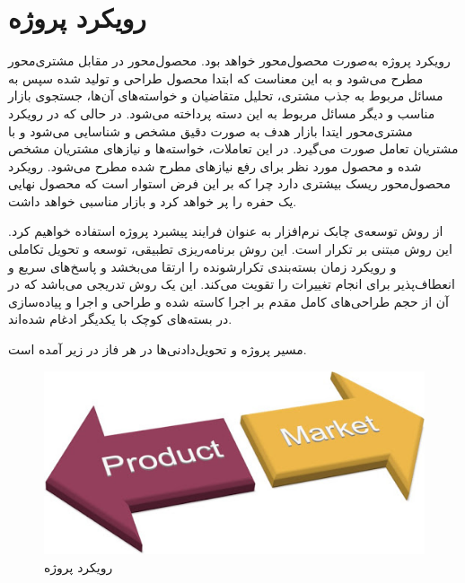 


\chapter{
	رویکرد پروژه 
}


رویکرد پروژه به‌صورت محصول‌محور
خواهد بود. محصول‌محور در مقابل مشتری‌محور 
مطرح می‌شود و به این معناست که ابتدا محصول طراحی و تولید شده سپس به مسائل مربوط به جذب مشتری، تحلیل متقاضیان و خواسته‌های آن‌ها، جستجوی بازار مناسب و دیگر مسائل مربوط به این دسته پرداخته می‌شود. در حالی که در رویکرد مشتری‌محور ایتدا بازار هدف به صورت دقیق مشخص و شناسایی می‌شود و با مشتریان تعامل صورت می‌گیرد. در این تعاملات، خواسته‌ها و نیازهای مشتریان مشخص شده و محصول مورد نظر برای رفع نیازهای مطرح شده مطرح می‌شود.
رویکرد محصول‌محور ریسک بیشتری دارد چرا که بر این فرض استوار است که محصول نهایی یک حفره را پر خواهد کرد و بازار مناسبی خواهد داشت.

از روش توسعه‌ی چابک نرم‌افزار 
به عنوان فرایند پیشبرد پروژه استفاده خواهیم کرد. 
این روش مبتنی بر تکرار است. این روش برنامه‌ریزی تطبیقی، توسعه و تحویل تکاملی و رویکرد زمان بسته‌بندی تکرارشونده را ارتقا می‌بخشد و پاسخ‌های سریع و انعطاف‌پذیر برای انجام تغییرات را تقویت می‌کند. این یک روش تدریجی می‌باشد که در آن از حجم طراحی‌های کامل مقدم بر اجرا کاسته شده و طراحی  و اجرا و پیاده‌سازی در بسته‌های کوچک با یکدیگر ادغام شده‌اند. 

مسیر پروژه و تحویل‌دادنی‌ها در هر فاز در زیر آمده‌ است.

\begin{figure}[h]
	\centering\includegraphics[scale=0.8]{product_vs_customer2}
	\caption{رویکرد پروژه}
	\label{phases} %
\end{figure}


